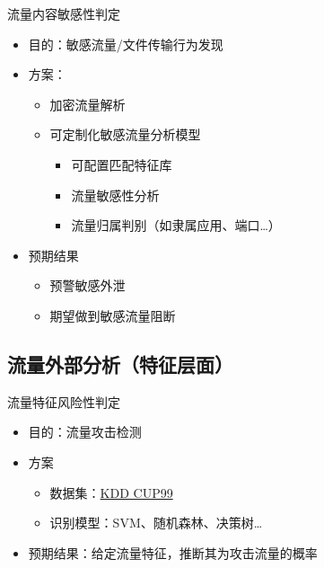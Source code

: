 \begin{frame}{流量内容敏感性判定}
    \begin{itemize}
        \item 目的：敏感流量/文件传输行为发现
        \item 方案：
            \begin{itemize}
                \item 加密流量解析
                \item 可定制化敏感流量分析模型
                    \begin{itemize}
                        \item 可配置匹配特征库
                        \item 流量敏感性分析
                        \item 流量归属判别（如隶属应用、端口\ldots）
                    \end{itemize}
            \end{itemize}
        \item 预期结果
            \begin{itemize}
                \item 预警敏感外泄
                \item 期望做到敏感流量阻断
            \end{itemize}
    \end{itemize}
\end{frame}


\subsection{流量外部分析（特征层面）}

\begin{frame}{流量特征风险性判定}
    \begin{itemize}
        \item 目的：流量攻击检测
        \item 方案
            \begin{itemize}
                \item 数据集：\href{https://www.kdd.org/kdd-cup/view/kdd-cup-1999}{KDD CUP99}
                \item 识别模型：SVM、随机森林、决策树\ldots
            \end{itemize}
        \item 预期结果：给定流量特征，推断其为攻击流量的概率
    \end{itemize}
\end{frame}
